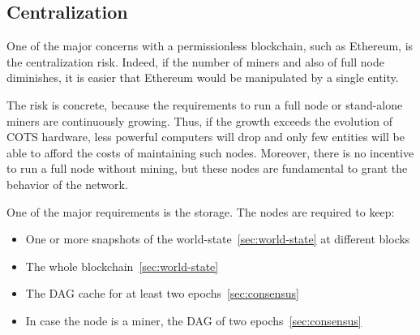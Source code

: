 \subsection{Centralization}

One of the major concerns with a permissionless blockchain, such as Ethereum,
is the centralization risk. Indeed, if the number of miners and also of full
node diminishes, it is easier that Ethereum would be manipulated by a single
entity.

The risk is concrete, because the requirements to run a full node or
stand-alone miners are continuously growing. Thus, if the growth exceeds the
evolution of COTS hardware, less powerful computers will drop and only few
entities will be able to afford the costs of maintaining such nodes. Moreover,
there is no incentive to run a full node without mining, but these nodes are
fundamental to grant the behavior of the network.

One of the major requirements is the storage. The nodes are required to keep:
\begin{itemize}
    \item One or more snapshots of the world-state~\autoref{sec:world-state}
    at different blocks
    \item The whole blockchain~\autoref{sec:world-state}
    \item The DAG cache for at least two epochs~\autoref{sec:consensus}
    \item In case the node is a miner, the DAG of two
    epochs~\autoref{sec:consensus}
\end{itemize}

